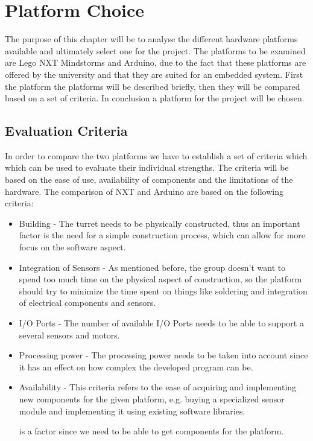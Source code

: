 \chapter{Platform Choice}\label{PlatformC}
The purpose of this chapter will be to analyse the different hardware platforms available
and ultimately select one for the project. The platforms to be examined are Lego
NXT Mindstorms and Arduino, due to the fact that these platforms are offered by
the university and that they are suited for an embedded system.
First the platform the platforms will be described briefly, then they will be
compared based on a set of criteria. In conclusion a platform for the project
will be chosen.

\section{Evaluation Criteria}\label{EvalCrit}
In order to compare the two platforms we have to establish a set of criteria
which which can be used to evaluate their individual strengths. The criteria
will be based on the ease of use, availability of components and the limitations
of the hardware. The comparison of NXT and Arduino are based on the following
criteria:

\begin{itemize}
  \item Building - The turret needs to be physically constructed, thus an
  important factor is the need for a simple construction process, which can
  allow for more focus on the software aspect.
  \item Integration of Sensors - As mentioned before, the group doesn't want to
  spend too much time on the physical aspect of construction, so the platform should try to minimize
  the time spent on things like soldering and integration of electrical
  components and sensors.
  \item I/O Ports - The number of available I/O Ports needs to be able to
  support a several sensors and motors.
  \item Processing power - The processing power needs to be taken into account
  since it has an effect on how complex the developed program can be.
  \item Availability - This criteria refers to the ease of acquiring and
  implementing new components for the given platform, e.g. buying a specialized
  sensor module and implementing it using existing software libraries. 
  
  is a factor since we
  need to be able to get components for the platform.
\end{itemize}

